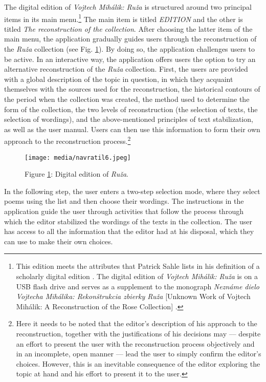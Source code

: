 \documentclass{article}
\begin{document}
The digital edition of \emph{Vojtech Mihálik:
Ruža} is structured around two principal items in its main menu.\footnote{This edition
  meets the attributes that Patrick Sahle lists in his
  definition of a scholarly digital edition \parencite[38]{sahle_what_2016}. The digital edition of
  \emph{Vojtech Mihálik: Ruža} is on a USB flash drive and serves as a
  supplement to the monograph \emph{Neznáme dielo Vojtecha Mihálika:
  Rekonštrukcia zbierky Ruža} [Unknown Work of Vojtech Mihálik: A
  Reconstruction of the Rose Collection] \parencite{navratil_nezname_2021}.} The main item is titled
\emph{EDITION} and the other is titled \emph{The reconstruction of the
collection}. After choosing the latter item of the main menu, the
application gradually guides users through the reconstruction of the
\emph{Ruža} collection (see Fig. \ref{fig:navratil3}). By doing so, the application challenges users to
be active. In an interactive way, the application offers users the
option to try an alternative reconstruction of the \emph{Ruža}
collection. First, the users are provided with a global description of
the topic in question, in which they acquaint themselves with the
sources used for the reconstruction, the historical contours of the
period when the collection was created, the method used to determine the
form of the collection, the two levels of reconstruction (the selection
of texts, the selection of wordings), and the above-mentioned principles of
text stabilization, as well as the user manual. Users can then use this
information to form their own approach to the reconstruction
process.\footnote{Here it needs to be noted that the editor's
  description of his approach to the reconstruction, together with the
  justifications of his decisions may –– despite an effort to
  present the user with the reconstruction process objectively and in an
  incomplete, open manner –– lead the user to simply confirm the
  editor's choices. However, this is an inevitable consequence of the
  editor exploring the topic at hand and his effort to present it to the
  user.}

\begin{figure}[t]
  \centering
  \texttt{[image: media/navratil6.jpeg]}
    \caption{Figure \ref{fig:navratil3}: Digital edition of \emph{Ruža}.}
    \label{fig:navratil3}
  \end{figure}

In the following step, the user enters a two-step selection mode, where
they select poems using the list and then choose their wordings. The
instructions in the application guide the user through activities that
follow the process through which the editor stabilized the wordings of
the texts in the collection. The user has access to all the information
that the editor had at his disposal, which they can use to make their
own choices.
\end{document}
